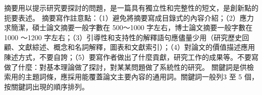 摘要用以提示研究要探討的問題，是一篇具有獨立性和完整性的短文，是創新點的扼要表述。
摘要寫作註意點：（1）避免將摘要寫成目錄式的內容介紹；（2）應力求簡潔，碩士論文摘要一般字數在 500～1000 字左右，博士論文摘要一般字數在 1000 ～1200 字左右；（3）引導性和支持性的解釋語句應儘量少用（研究歷史回顧、文獻綜述、概念和名詞解釋，圖表和文獻索引）；（4）對論文的價值描述應用陳述方式，不要自誇；（5）要寫作者做出了什麼貢獻，研究工作的成果等。不要寫做了什麼：對基本理論做了探討，對某某問題做了系統性的研究。
關鍵詞是供檢索用的主題詞條，應採用能覆蓋論文主要內容的通用詞。關鍵詞一般列3 至 5 個，按關鍵詞出現的順序排列。
